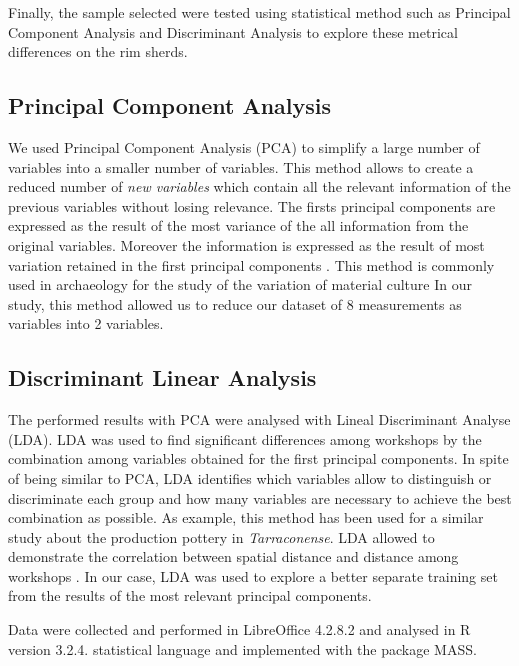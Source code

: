 \documentclass[review]{elsarticle}
\begin{document}
Finally, the sample selected were tested using statistical method such as Principal Component Analysis and Discriminant Analysis to explore these metrical differences on the rim sherds. 
 

\subsection{Principal Component Analysis}


We used Principal Component Analysis (PCA) to simplify a large number of variables into a smaller number of variables. This method allows to create a reduced number of \textit{new variables} which contain all the relevant information of the previous variables without losing relevance. The firsts principal components are expressed as the result of the most variance of the all information from the original variables. Moreover the information is expressed as the result of most variation retained in the first principal components \citep{jolliffe_principal_2002, shennan_quantifying_1997}. 
This method is commonly used in archaeology for the study of the variation of material culture \citep{li_crossbows_2014, schillinger_differences_2016} 
In our study, this method allowed us to reduce our dataset of 8 measurements as variables into 2 variables. 


\subsection{Discriminant Linear Analysis} 


The performed results with PCA were analysed with Lineal Discriminant Analyse (LDA). LDA was used to find significant differences among workshops by the combination among variables obtained for the first principal components. In spite of being similar to PCA, LDA identifies which variables allow to distinguish or discriminate each group and how many variables are necessary to achieve the best combination as possible. As example, this method has been used for a similar study about the production pottery in \emph{Tarraconense}. LDA allowed to demonstrate the correlation between spatial distance and distance among workshops \citep{i_martin_alisis_1998}. In our case, LDA was used to explore a better separate training set from the results of the most relevant principal components. 


Data were collected and performed in LibreOffice 4.2.8.2 and analysed in R version 3.2.4. statistical language and implemented with the package MASS. 
\end{document}
